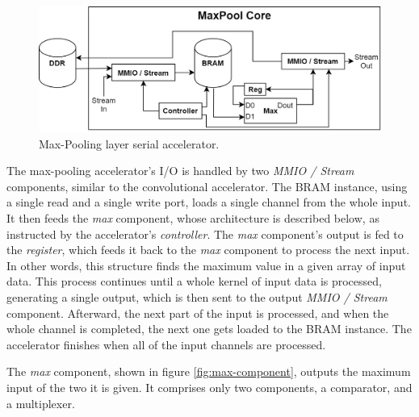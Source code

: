 \begin{figure} [H]
	\centering
	\includegraphics[width=\textwidth]{Images/Platform/MaxPool_core_serial.png}
	\decoRule
	\caption[Max-Pooling layer serial accelerator]{Max-Pooling layer serial accelerator.}
	\label{fig:max-pool-core-serial}
\end{figure}

The max-pooling accelerator's I/O is handled by two \emph{MMIO / Stream} components, similar to the convolutional accelerator. The BRAM instance, using a single read and a single write port, loads a single channel from the whole input. It then feeds the \emph{max} component, whose architecture is described below, as instructed by the accelerator's \emph{controller}. The \emph{max} component's output is fed to the \emph{register}, which feeds it back to the \emph{max} component to process the next input. In other words, this structure finds the maximum value in a given array of input data. This process continues until a whole kernel of input data is processed, generating a single output, which is then sent to the output \emph{MMIO / Stream} component. Afterward, the next part of the input is processed, and when the whole channel is completed, the next one gets loaded to the BRAM instance. The accelerator finishes when all of the input channels are processed.

The \emph{max} component, shown in figure \ref{fig:max-component}, outputs the maximum input of the two it is given. It comprises only two components, a comparator, and a multiplexer.


